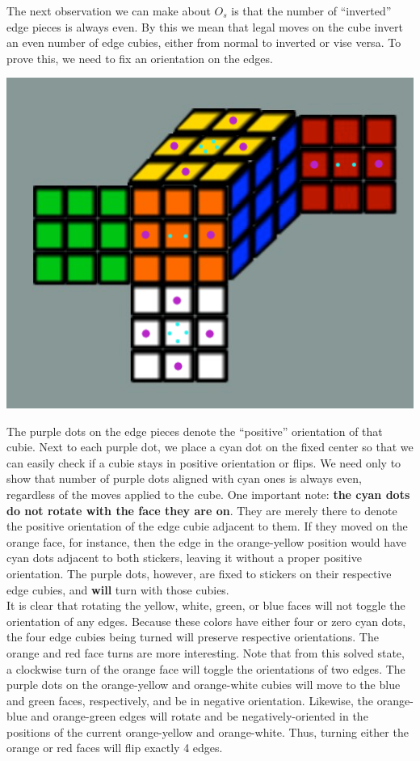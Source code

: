 \documentclass[10pt,letterpaper]{report}
\begin{document}
The next observation we can make about $O_s$ is that the number of ``inverted'' edge pieces is always even.  By this we mean that legal moves on the cube invert an even number of edge cubies, either from normal to inverted or vise versa.  To prove this, we need to fix an orientation on the edges. \\
\begin{center}
\includegraphics[scale=.65]{images/edgeOrientation.png} 
\end{center}
The purple dots on the edge pieces denote the ``positive'' orientation of that cubie.  Next to each purple dot, we place a cyan dot on the fixed center so that we can easily check if a cubie stays in positive orientation or flips.  We need only to show that number of purple dots aligned with cyan ones is always even, regardless of the moves applied to the cube.  One important note: \textbf{the cyan dots do not rotate with the face they are on}.  They are merely there to denote the positive orientation of the edge cubie adjacent to them.  If they moved on the orange face, for instance, then the edge in the orange-yellow position would have cyan dots adjacent to both stickers, leaving it without a proper positive orientation.  The purple dots, however, are fixed to stickers on their respective edge cubies, and \textbf{will} turn with those cubies. \\

It is clear that rotating the yellow, white, green, or blue faces will not toggle the orientation of any edges.  Because these colors have either four or zero cyan dots, the four edge cubies being turned will preserve respective orientations.  The orange and red face turns are more interesting.  Note that from this solved state, a clockwise turn of the orange face will toggle the orientations of two edges.  The purple dots on the orange-yellow and orange-white cubies will move to the blue and green faces, respectively, and be in negative orientation.  Likewise, the orange-blue and orange-green edges will rotate and be negatively-oriented in the positions of the current orange-yellow and orange-white.  Thus, turning either the orange or red faces will flip exactly 4 edges. \\
\end{document}
